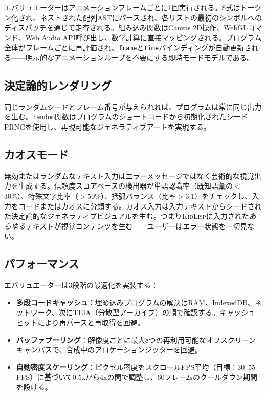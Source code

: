 \documentclass[10pt,letterpaper,twocolumn]{article}
\newcommand{\kidlisp}{\textsc{KidLisp}}
\begin{document}
エバリュエーターはアニメーションフレームごとに1回実行される。S式はトークン化され、ネストされた配列ASTにパースされ、各リストの最初のシンボルへのディスパッチを通じて走査される。組み込み関数はCanvas 2D操作、WebGLコマンド、Web Audio API呼び出し、数学計算に直接マッピングされる。プログラム全体がフレームごとに再評価され、\texttt{frame}と\texttt{time}バインディングが自動更新される——明示的なアニメーションループを不要にする即時モードモデルである。

\subsection{決定論的レンダリング}

同じランダムシードとフレーム番号が与えられれば、プログラムは常に同じ出力を生む。\texttt{random}関数はプログラムのショートコードから初期化されたシードPRNGを使用し、再現可能なジェネラティブアートを実現する。

\subsection{カオスモード}

無効またはランダムなテキスト入力はエラーメッセージではなく芸術的な視覚出力を生成する。信頼度スコアベースの検出器が単語認識率（既知語彙の$<$30\%）、特殊文字比率（$>$50\%）、括弧バランス（比率$>$3:1）をチェックし、入力をコードまたはカオスに分類する。カオス入力は入力テキストからシードされた決定論的なジェネラティブビジュアルを生む。つまり\kidlisp{}に入力された\emph{あらゆる}テキストが視覚コンテンツを生む——ユーザーはエラー状態を一切見ない。

\subsection{パフォーマンス}

エバリュエーターは3段階の最適化を実装する：

\begin{itemize}
  \item \textbf{多段コードキャッシュ}：埋め込みプログラムの解決はRAM、IndexedDB、ネットワーク、次にTEIA（分散型アーカイブ）の順で確認する。キャッシュヒットにより再パースと再取得を回避。
  \item \textbf{バッファプーリング}：解像度ごとに最大8つの再利用可能なオフスクリーンキャンバスで、合成中のアロケーションジッターを回避。
  \item \textbf{自動密度スケーリング}：ピクセル密度をスクロールFPS平均（目標：30--55 FPS）に基づいて0.5xから4xの間で調整し、60フレームのクールダウン期間を設ける。
\end{itemize}
\end{document}
